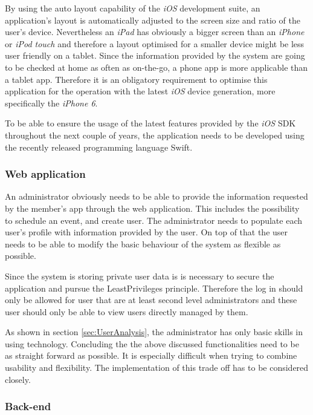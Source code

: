 By using the auto layout capability of the \emph{iOS} development suite, an application's layout is automatically adjusted to the screen size and ratio of the user's device. Nevertheless an \emph{iPad} has obviously a bigger screen than an \emph{iPhone} or \emph{iPod touch} and therefore a layout optimised for a smaller device might be less user friendly on a tablet. Since the information provided by the system are going to be checked at home as often as on-the-go, a phone app is more applicable than a tablet app. Therefore it is an obligatory requirement to optimise this application for the operation with the latest \emph{iOS} device generation, more specifically the \emph{iPhone 6}.

To be able to ensure the usage of the latest features provided by the \emph{iOS} \gls{SDK} throughout the next couple of years, the application needs to be developed using the recently released programming language \gls{Swift}.

\subsubsection{Web application}

An administrator obviously needs to be able to provide the information requested by the member's app through the web application. This includes the possibility to schedule an event, and create user. The administrator needs to populate each user's profile with information provided by the user. On top of that the user needs to be able to modify the basic behaviour of the system as flexible as possible.

Since the system is storing private user data is is necessary to secure the application and pursue the \gls{LeastPrivileges} principle. Therefore the log in should only be allowed for user that are at least second level administrators and these user should only be able to view users directly managed by them.

As shown in section \vref{sec:UserAnalysis}, the administrator has only basic skills in using technology. Concluding the the above discussed functionalities need to be as straight forward as possible. It is especially difficult when trying to combine usability and flexibility. The implementation of this trade off has to be considered closely.

\subsubsection{Back-end}


